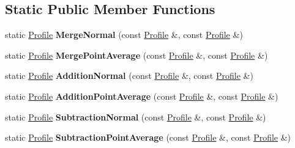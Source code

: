 \subsection*{Static Public Member Functions}
\begin{DoxyCompactItemize}
\item 
\mbox{\label{classQn_1_1Profile_a0cc0eb7446f5df2538ef2e74a23e9370}} 
static \mbox{\hyperlink{classQn_1_1Profile}{Profile}} {\bfseries Merge\+Normal} (const \mbox{\hyperlink{classQn_1_1Profile}{Profile}} \&, const \mbox{\hyperlink{classQn_1_1Profile}{Profile}} \&)
\item 
\mbox{\label{classQn_1_1Profile_a6da2a95bfcfc64778a071afe53081ff8}} 
static \mbox{\hyperlink{classQn_1_1Profile}{Profile}} {\bfseries Merge\+Point\+Average} (const \mbox{\hyperlink{classQn_1_1Profile}{Profile}} \&, const \mbox{\hyperlink{classQn_1_1Profile}{Profile}} \&)
\item 
\mbox{\label{classQn_1_1Profile_a4b0d9721247f1b92eff359d1a08b7f89}} 
static \mbox{\hyperlink{classQn_1_1Profile}{Profile}} {\bfseries Addition\+Normal} (const \mbox{\hyperlink{classQn_1_1Profile}{Profile}} \&, const \mbox{\hyperlink{classQn_1_1Profile}{Profile}} \&)
\item 
\mbox{\label{classQn_1_1Profile_adad2e4666f8105b1db929f638928640e}} 
static \mbox{\hyperlink{classQn_1_1Profile}{Profile}} {\bfseries Addition\+Point\+Average} (const \mbox{\hyperlink{classQn_1_1Profile}{Profile}} \&, const \mbox{\hyperlink{classQn_1_1Profile}{Profile}} \&)
\item 
\mbox{\label{classQn_1_1Profile_ad63be60ee11c31fc9c3bc65978f7447a}} 
static \mbox{\hyperlink{classQn_1_1Profile}{Profile}} {\bfseries Subtraction\+Normal} (const \mbox{\hyperlink{classQn_1_1Profile}{Profile}} \&, const \mbox{\hyperlink{classQn_1_1Profile}{Profile}} \&)
\item 
\mbox{\label{classQn_1_1Profile_a612cff844bf93f356ac28c08f0b5910b}} 
static \mbox{\hyperlink{classQn_1_1Profile}{Profile}} {\bfseries Subtraction\+Point\+Average} (const \mbox{\hyperlink{classQn_1_1Profile}{Profile}} \&, const \mbox{\hyperlink{classQn_1_1Profile}{Profile}} \&)
\item 

\end{DoxyCompactItemize}

